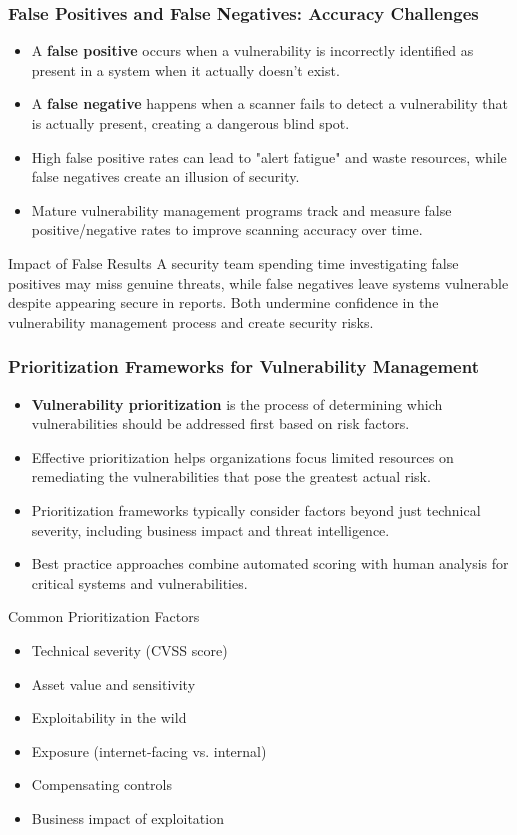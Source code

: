 \documentclass{beamer}
\begin{document}
\begin{frame}
\frametitle{False Positives and False Negatives: Accuracy Challenges}
\begin{itemize}
\item A \textbf{false positive} occurs when a vulnerability is incorrectly identified as present in a system when it actually doesn't exist.
\item A \textbf{false negative} happens when a scanner fails to detect a vulnerability that is actually present, creating a dangerous blind spot.
\item High false positive rates can lead to "alert fatigue" and waste resources, while false negatives create an illusion of security.
\item Mature vulnerability management programs track and measure false positive/negative rates to improve scanning accuracy over time.
\end{itemize}

\begin{exampleblock}{Impact of False Results}
A security team spending time investigating false positives may miss genuine threats, while false negatives leave systems vulnerable despite appearing secure in reports. Both undermine confidence in the vulnerability management process and create security risks.
\end{exampleblock}
\end{frame}

\begin{frame}
\frametitle{Prioritization Frameworks for Vulnerability Management}
\begin{itemize}
\item \textbf{Vulnerability prioritization} is the process of determining which vulnerabilities should be addressed first based on risk factors.
\item Effective prioritization helps organizations focus limited resources on remediating the vulnerabilities that pose the greatest actual risk.
\item Prioritization frameworks typically consider factors beyond just technical severity, including business impact and threat intelligence.
\item Best practice approaches combine automated scoring with human analysis for critical systems and vulnerabilities.
\end{itemize}

\begin{block}{Common Prioritization Factors}
\scriptsize
\begin{itemize}
\item Technical severity (CVSS score)
\item Asset value and sensitivity
\item Exploitability in the wild
\item Exposure (internet-facing vs. internal)
\item Compensating controls
\item Business impact of exploitation
\end{itemize}
\end{block}
\end{frame}
\end{document}
